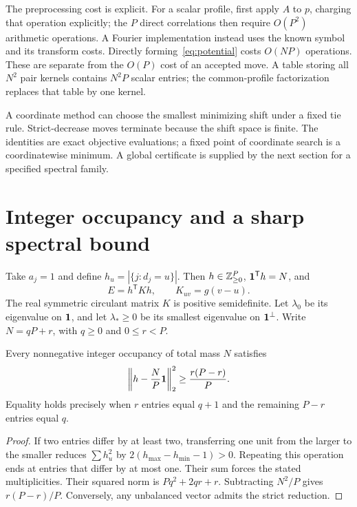 \documentclass[11pt,a4paper]{article}
\begin{document}
The preprocessing cost is explicit. For a scalar profile, first apply $A$ to $p$, charging that operation
explicitly; the $P$ direct correlations then require $O(P^2)$ arithmetic
operations. A Fourier implementation instead uses the known symbol and
its transform costs. Directly
forming~\eqref{eq:potential} costs $O(NP)$ operations. These are separate
from the $O(P)$ cost of an accepted move. A table storing all $N^2$
pair kernels contains $N^2P$ scalar entries; the common-profile
factorization replaces that table by one kernel.

A coordinate method can choose the smallest minimizing shift under a
fixed tie rule. Strict-decrease moves terminate because the shift space
is finite. The identities are exact objective evaluations; a fixed point
of coordinate search is a coordinatewise minimum. A global certificate
is supplied by the next section for a specified spectral family.

\section{Integer occupancy and a sharp spectral bound}
Take $a_j=1$ and define
$h_u=|\{j:d_j=u\}|$. Then $h\in\mathbb Z_{\ge0}^P$, $\mathbf 1^\mathsf Th=N$, and
\[
 E=h^\mathsf TKh,\qquad K_{uv}=g(v-u).
\]
The real symmetric circulant matrix $K$ is positive semidefinite.
Let $\lambda_0$ be its eigenvalue on $\mathbf 1$, and let
$\lambda_*\ge0$ be its smallest eigenvalue on $\mathbf 1^\perp$.
Write $N=qP+r$, with $q\ge0$ and $0\le r<P$.

\begin{lemma}\label{lem:balance}
Every nonnegative integer occupancy of total mass $N$ satisfies
\begin{equation}\label{eq:integer}
 \left\|h-\frac NP\mathbf 1\right\|_2^2
 \ge\frac{r(P-r)}P.
\end{equation}
Equality holds precisely when $r$ entries equal $q+1$ and the remaining
$P-r$ entries equal $q$.
\end{lemma}
\begin{proof}
If two entries differ by at least two, transferring one unit from the
larger to the smaller reduces $\sum h_u^2$ by
$2(h_{\max}-h_{\min}-1)>0$. Repeating this operation ends at entries that
differ by at most one. Their sum forces the stated multiplicities.
Their squared norm is $Pq^2+2qr+r$. Subtracting $N^2/P$ gives
$r(P-r)/P$. Conversely, any unbalanced vector admits the strict reduction.
\end{proof}
\end{document}
